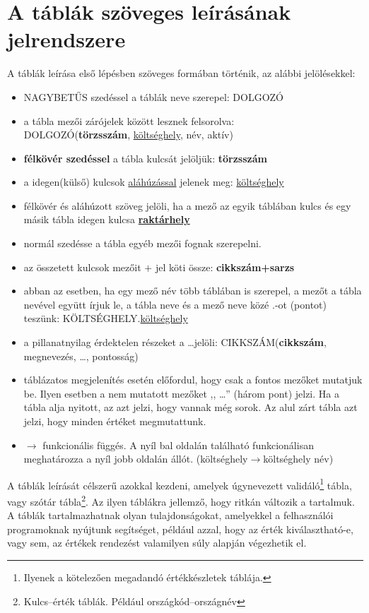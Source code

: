 \documentclass[a4paper,12pt]{report}
\newcommand{\pk}[1]{\textbf{#1}} %
\newcommand{\fk}[1]{\underline{#1}} %
\newcommand{\tabla}[1]{\noindent\MakeUppercase{#1}} %
\newcommand{\tmezo}[2]{\MakeUppercase{#1}.{\underline{#2}}} %
\begin{document}
\section{A táblák szöveges leírásának jelrendszere}
A táblák leírása első lépésben szöveges formában történik, az alábbi 
jelölésekkel:
\begin{itemize}
 \item \tabla{nagybetűs} szedéssel a táblák neve szerepel: \tabla{dolgozó}
 \item a tábla mezői zárójelek között lesznek felsorolva:\\ 
 \tabla{DOLGOZÓ}(\pk{törzsszám}, \fk{költséghely}, név, aktív)
 \item \pk{félkövér szedéssel} a tábla kulcsát jelöljük: \pk{törzsszám}
 \item a idegen(külső) kulcsok \fk{aláhúzással} jelenek meg: 
 \fk{költséghely}
 \item félkövér és aláhúzott szöveg jelöli, ha a mező az egyik táblában kulcs 
és egy másik tábla idegen kulcsa \pk{\fk{raktárhely}} 
\item normál szedésse a tábla egyéb mezői fognak szerepelni.
\item az összetett kulcsok mezőit $+$ jel köti össze: \pk{cikkszám+sarzs}
\item abban az esetben, ha egy mező név több táblában is szerepel, a mezőt 
a tábla nevével együtt írjuk le, a tábla neve és a mező neve közé .-ot 
(pontot) teszünk: \tmezo{KÖLTSÉGHELY}{költséghely}
\item a pillanatnyilag érdektelen részeket a \dots jelöli:
\tabla{cikkszám}(\pk{cikkszám}, megnevezés, \dots, pontosság)
\item táblázatos megjelenítés esetén előfordul, hogy csak a fontos mezőket 
mutatjuk be. Ilyen esetben a nem mutatott mezőket ,, \dots  '' (három pont) 
jelzi. Ha a tábla alja nyitott, az azt jelzi, hogy vannak még sorok. Az 
alul zárt tábla azt jelzi, hogy minden értéket megmutattunk.
\item $\rightarrow$ funkcionális függés. A nyíl bal oldalán található funkcionálisan meghatározza a nyíl jobb oldalán állót. (költséghely$\rightarrow$költséghely név)
\end{itemize}

A táblák leírását célszerű azokkal kezdeni, amelyek úgynevezett 
validáló\footnote{Ilyenek a kötelezően megadandó értékkészletek táblája.} tábla, vagy
szótár tábla\footnote{Kulcs--érték táblák. Például országkód--országnév}. 
Az ilyen táblákra jellemző, hogy ritkán változik a tartalmuk. A táblák 
tartalmazhatnak olyan tulajdonságokat, amelyekkel a felhasználói
programoknak nyújtunk segítséget, például azzal, hogy az érték
kiválasztható-e, vagy sem, az értékek rendezést valamilyen súly alapján 
végezhetik el.
\end{document}
